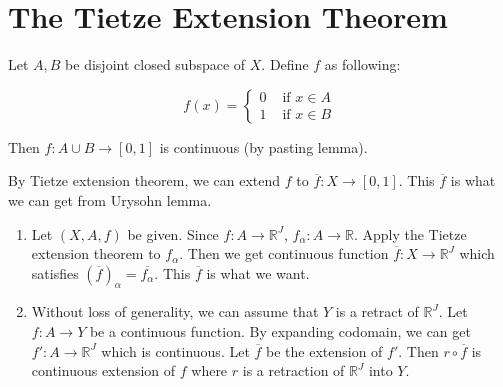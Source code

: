 \setcounter{section}{34}
\section{The Tietze Extension Theorem}

\begin{problem}[1]
	\hfill 

	Let $A, B$ be disjoint closed subspace of $X$. Define $f$ as following:

	\begin{equation*}
		f(x) = 
		\begin{cases}
			0 &  \text{ if } x \in A \\
			1 &  \text{ if } x \in B
		\end{cases}
		\label{<+label+>}
	\end{equation*}
	
	Then $f : A \cup B \rightarrow \left[ 0, 1 \right]$ is continuous (by pasting lemma).

	By Tietze extension theorem, we can extend $f$ to $\overline{f} : X \rightarrow \left[ 0, 1 \right]$. This $\overline{f}$ is what we can get from Urysohn lemma.
\end{problem}

\begin{problem}[5] \hfill

	\begin{enumerate}[label = (\alph*)]
		\item Let $\left( X, A, f \right)$ be given. Since $f : A \rightarrow \mathbb{R}^J$, $f_\alpha : A \rightarrow \mathbb{R}$. Apply the Tietze extension theorem to $f_\alpha$. Then we get continuous function $\overline{f} : X \rightarrow \mathbb{R}^J$ which satisfies $\left( \overline{f} \right)_\alpha = \overline{f_\alpha}$. This $\overline{f}$ is what we want.

		\item Without loss of generality, we can assume that $Y$ is a retract of $\mathbb{R}^J$. Let $f : A \rightarrow Y$ be a continuous function. By expanding codomain, we can get $f' : A \rightarrow \mathbb{R}^J$ which is continuous. Let $\overline{f}$ be the extension of $f'$. Then $r \circ \overline{f}$ is continuous extension of $f$ where $r$ is a retraction of $\mathbb{R}^J$ into $Y$.
	\end{enumerate}
\end{problem}

